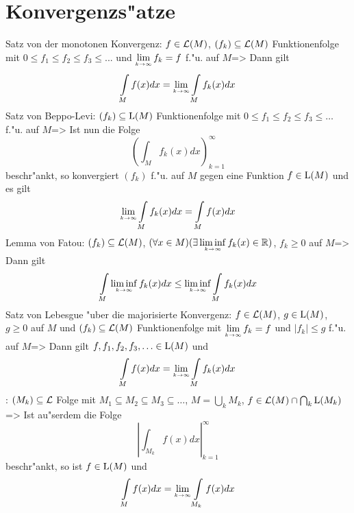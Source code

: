 \section{Konvergenzs"atze}
\theorem Satz von der monotonen Konvergenz:
  $f\in\mathcal{L}(M)$, $(f_k)\subseteq\mathcal{L}(M)$ Funktionenfolge mit
  $0\le f_1\le f_2\le f_3\le ...$ und $\limes k->\infty f_k=f$ f."u. auf
  $M$=>{
  Dann gilt
  \[\int_M f(x)dx=\limes k->\infty \int_M f_k(x)dx
    \]
  }
\theorem Satz von Beppo-Levi:
  $(f_k)\subseteq{\rm L}(M)$ Funktionenfolge mit
  $0\le f_1\le f_2\le f_3\le\ldots$ f."u. auf $M$=>{
  Ist nun die Folge
  \[\left(\int_M f_k(x) dx\right)_{k=1}^\infty
    \]
  beschr"ankt, so konvergiert $(f_k)$ f."u. auf $M$ gegen eine Funktion
  $f\in{\rm L}(M)$ und es gilt
  \[\limes k->\infty \int_Mf_k(x)dx=\int_M f(x) dx
    \]
  }
\theorem Lemma von Fatou:
  $(f_k)\subseteq\mathcal{L}(M)$, 
  $(\forall x\in M)(\exists \limesinf k->\infty f_k(x)\in\SetR)$, 
  $f_k\ge 0$ auf $M$=>{
  Dann gilt
  \[\int_M \limesinf k->\infty f_k(x) dx \le \limesinf k->\infty \int_M f_k(x) dx
    \]
  }
\theorem Satz von Lebesgue "uber die majorisierte Konvergenz:
  $f\in\mathcal{L}(M)$, $g\in{\rm L}(M)$, $g\ge 0$ auf $M$ und 
  $(f_k)\subseteq\mathcal{L}(M)$ Funktionenfolge mit $\limes k->\infty f_k=f$ 
  und $|f_k|\le g$ f."u. auf $M$=>{
  Dann gilt $f,f_1,f_2,f_3,\ldots\in{\rm L}(M)$ und
  \[\int_M f(x)dx=\limes k->\infty \int_M f_k(x)dx
    \]
  }
\theorem:
  $(M_k)\subseteq\mathcal{L}$ Folge mit $M_1\subseteq M_2\subseteq M_3\subseteq\ldots$,
  $M=\bigcup_k M_k$, $f\in\mathcal{L}(M)\cap \bigcap_k {\rm L}(M_k)$=>{
  Ist au"serdem die Folge
  \[\left|\int_{M_k} f(x) dx\right|_{k=1}^\infty
    \]
  beschr"ankt, so ist $f\in{\rm L}(M)$ und 
  \[\int_M f(x)dx=\limes k->\infty \int_{M_k} f(x) dx
    \]   
}
